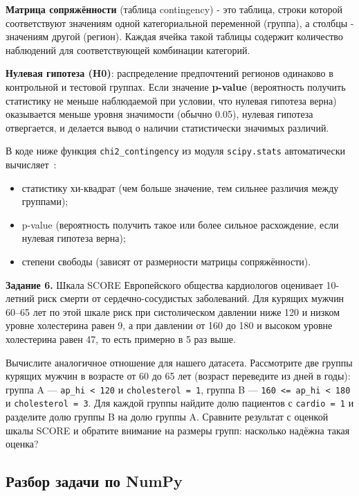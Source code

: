 \documentclass[pract]{SCWorks}
\begin{document}
\textbf{Матрица сопряжённости} (таблица contingency) - это таблица, строки которой соответствуют значениям одной 
категориальной переменной (группа), а столбцы - значениям другой (регион). Каждая ячейка такой таблицы содержит 
количество наблюдений для соответствующей комбинации категорий.

\textbf{Нулевая гипотеза (H0)}: распределение предпочтений регионов одинаково в контрольной и тестовой группах. 
Если значение \textbf{p-value} (вероятность получить статистику не меньше наблюдаемой при условии, что нулевая гипотеза верна) оказывается меньше 
уровня значимости (обычно 0.05), нулевая гипотеза отвергается, и делается вывод о наличии статистически 
значимых различий.

В коде ниже функция \texttt{chi2\_contingency} из модуля \texttt{scipy.stats} автоматически вычисляет~\cite{scipy-chi2}:
\begin{itemize}
    \item статистику хи-квадрат (чем больше значение, тем сильнее различия между группами);
    \item p-value (вероятность получить такое или более сильное расхождение, если нулевая гипотеза верна);
    \item степени свободы (зависят от размерности матрицы сопряжённости).
\end{itemize}

\medskip
\noindent\textbf{Задание 6.} Шкала SCORE Европейского общества кардиологов оценивает 10-летний риск смерти от
сердечно-сосудистых заболеваний. Для курящих мужчин 60--65 лет по этой шкале риск при систолическом давлении
ниже 120 и низком уровне холестерина равен 9, а при давлении от 160 до 180 и высоком уровне холестерина
равен 47, то есть примерно в 5 раз выше.

Вычислите аналогичное отношение для нашего датасета. Рассмотрите две группы курящих мужчин в возрасте от 60 до
65 лет (возраст переведите из дней в годы): группа A --- \texttt{ap\_hi < 120} и \texttt{cholesterol = 1},
группа B --- \texttt{160 <= ap\_hi < 180} и \texttt{cholesterol = 3}. Для каждой группы найдите долю пациентов с
\texttt{cardio = 1} и разделите долю группы B на долю группы A. Сравните результат с оценкой шкалы SCORE и
обратите внимание на размеры групп: насколько надёжна такая оценка?

\subsection{Разбор задачи по NumPy}
\end{document}

